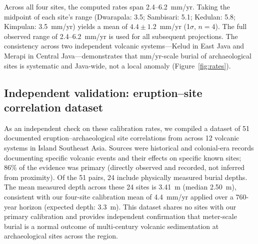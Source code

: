 \documentclass[12pt,a4paper]{article}
\begin{document}
\begin{table}[htbp]
\centering
\caption{Empirical calibration points for volcanic sedimentation rates at archaeological sites in Java. BPCB-Jatim and BPCB-DIY are Indonesia's regional heritage conservation agencies (\textit{Balai Pelestarian Cagar Budaya}, Ministry of Education and Culture); burial depths are from their published excavation reports. Sambisari and Kedulan depths are cited in \citet{lavigne2000} and \citet{thouret2000}.}
\label{tab:calibration}
\end{table}

Across all four sites, the computed rates span 2.4--6.2~mm/yr. Taking the midpoint of each site's range (Dwarapala: 3.5; Sambisari: 5.1; Kedulan: 5.8; Kimpulan: 3.5~mm/yr) yields a mean of $4.4 \pm 1.2$~mm/yr (1$\sigma$, $n=4$). The full observed range of 2.4--6.2~mm/yr is used for all subsequent projections. The consistency across two independent volcanic systems---Kelud in East Java and Merapi in Central Java---demonstrates that mm/yr-scale burial of archaeological sites is systematic and Java-wide, not a local anomaly (Figure~\ref{fig:rates}).

\subsection{Independent validation: eruption--site correlation dataset}

As an independent check on these calibration rates, we compiled a dataset of 51 documented eruption--archaeological site correlations from across 12 volcanic systems in Island Southeast Asia. Sources were historical and colonial-era records documenting specific volcanic events and their effects on specific known sites; 86\% of the evidence was primary (directly observed and recorded, not inferred from proximity). Of the 51 pairs, 24 include physically measured burial depths. The mean measured depth across these 24 sites is 3.41~m (median 2.50~m), consistent with our four-site calibration mean of 4.4~mm/yr applied over a 760-year horizon (expected depth: 3.3~m). This dataset shares no sites with our primary calibration and provides independent confirmation that meter-scale burial is a normal outcome of multi-century volcanic sedimentation at archaeological sites across the region.
\end{document}
